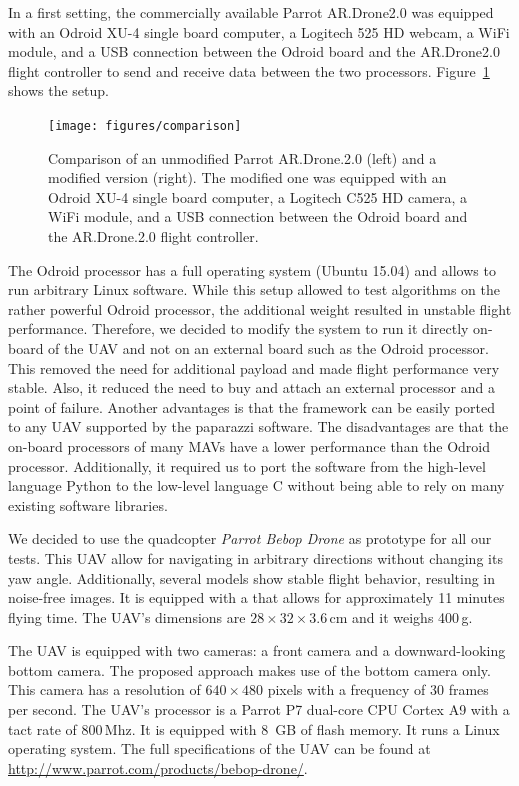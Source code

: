 In a first setting, the commercially available Parrot AR.Drone2.0 was
equipped with an Odroid XU-4 single board computer, a Logitech 525 HD
webcam, a WiFi module, and a USB connection between the Odroid board
and the AR.Drone2.0 flight controller to send and receive data between
the two processors. Figure~\ref{fig:comparison} shows the setup.

\begin{figure}[h!]
\begin{center}
\texttt{[image: figures/comparison]}
\caption{{\label{fig:comparison} Comparison of an unmodified Parrot AR.Drone.2.0 (left) and a
    modified version (right). The modified one was equipped with an
    Odroid XU-4 single board computer, a Logitech C525 HD camera, a
    WiFi module, and a USB connection between the Odroid board and the
    AR.Drone.2.0 flight controller.%
}}
\end{center}
\end{figure}

The Odroid processor has a full operating system (Ubuntu 15.04) and
allows to run arbitrary Linux software. While this setup allowed to
test algorithms on the rather powerful Odroid processor, the
additional weight resulted in unstable flight performance. Therefore,
we decided to modify the system to run it directly on-board of the UAV
and not on an external board such as the Odroid processor. This
removed the need for additional payload and made flight performance
very stable. Also, it reduced the need to buy and attach an external
processor and a point of failure. Another advantages is that the
framework can be easily ported to any UAV supported by the paparazzi
software. The disadvantages are that the on-board processors of many
MAVs have a lower performance than the Odroid processor. Additionally,
it required us to port the software from the high-level language
Python to the low-level language C without being able to rely on many
existing software libraries.

We decided to use the quadcopter \emph{Parrot Bebop Drone}
as prototype for all our tests. This UAV allow for navigating in
arbitrary directions without changing its yaw angle. Additionally,
several models show stable flight behavior, resulting in noise-free
images. It is equipped with a that allows for approximately 11 minutes
flying time. The UAV's dimensions are $28 \times 32 \times 3.6$\,cm
and it weighs 400\,g.

The UAV is equipped with two cameras: a front camera and a
downward-looking bottom camera. The proposed approach makes use of the
bottom camera only. This camera has a resolution of $640 \times 480$
pixels with a frequency of 30 frames per second. The UAV's processor
is a Parrot P7 dual-core CPU Cortex A9 with a tact rate of
800\,Mhz. It is equipped with 8~GB of flash memory. It runs a Linux
operating system. The full specifications of the UAV can be found at
\url{http://www.parrot.com/products/bebop-drone/}.

